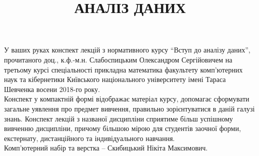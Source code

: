\documentclass[a5paper, 10pt]{article}
\title{{\Huge АНАЛІЗ ДАНИХ}}
\date{}
\begin{document}
\maketitle \thispagestyle{empty} \newpage 

У ваших руках конспект лекцій з нормативного курсу ``Вступ до аналізу даних'', прочитаного доц., к.ф.-м.н. Слабоспицьким Олександром Сергійовичем на третьому курсі спеціальності прикладна математика факультету комп'ютерних наук та кібернетики Київського національного університету імені Тараса Шевченка восени 2018-го року. \\

Конспект у компактній формі відображає матеріал курсу, допомагає сформувати загальне уявлення про предмет вивчення, правильно зорієнтуватися в даній галузі знань. Конспект лекцій з названої дисципліни сприятиме більш успішному вивченню дисципліни, причому більшою мірою для студентів заочної форми, екстернату, дистанційного та індивідуального навчання. \\

Комп'ютерний набір та верстка -- Скибицький Нікіта Максимович. \newpage

\tableofcontents \newpage
























\end{document}
